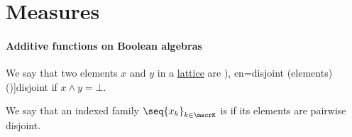 \section{Measures}\label{sec:measures}

\paragraph{Additive functions on Boolean algebras}

\begin{definition}\label{def:disjoint_lattice_elements}
  We say that two elements \( x \) and \( y \) in a \hyperref[def:lattice]{lattice} are \term[ru=дизъюнктные (элементы) (\cite[18]{Владимиров1969БулевыАлгебры}), en=disjoint (elements) (\cite[45]{Birkhoff1967LatticeTheory})]{disjoint} if \( x \wedge y = \bot \).

  We say that an indexed family \( \seq{ x_k }_{k \in \mscrK} \) is  if its elements are pairwise disjoint.
\end{definition}

